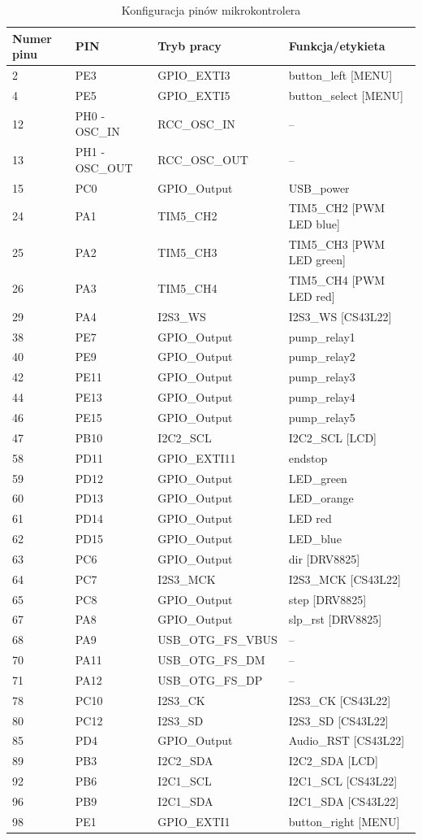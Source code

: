 \documentclass[10pt, a4paper]{article}
\begin{document}
\begin{table}[H]
	\centering
	\begin{tabular}{|l|l|l|l|}
		\hline
		Numer pinu	&	PIN & Tryb pracy & Funkcja/etykieta\\
		\hline
2&	PE3&	GPIO{\_}EXTI3&	button{\_}left [MENU] \\
4&	PE5&	GPIO{\_}EXTI5&	button{\_}select [MENU] \\
12&	PH0 - OSC{\_}IN&	RCC{\_}OSC{\_}IN& --	\\
13&	PH1 - OSC{\_}OUT&	RCC{\_}OSC{\_}OUT& --\\
15&	PC0&	GPIO{\_}Output&	USB{\_}power\\
24&	PA1&	TIM5{\_}CH2&	TIM5{\_}CH2 [PWM LED blue] \\
25&	PA2&	TIM5{\_}CH3&	TIM5{\_}CH3 [PWM LED green] \\
26&	PA3&	TIM5{\_}CH4&	TIM5{\_}CH4 [PWM LED red] \\
29&	PA4&	I2S3{\_}WS&	I2S3{\_}WS [CS43L22] \\
38&	PE7&	GPIO{\_}Output&	pump{\_}relay1\\
40&	PE9&	GPIO{\_}Output& pump{\_}relay2\\
42&	PE11&	GPIO{\_}Output&	pump{\_}relay3\\
44&	PE13&  GPIO{\_}Output&	pump{\_}relay4\\
46&	PE15&	GPIO{\_}Output& pump{\_}relay5\\
47&	PB10&	I2C2{\_}SCL&	I2C2{\_}SCL [LCD] \\
58&	PD11&	GPIO{\_}EXTI11&	endstop\\
59&	PD12&	GPIO{\_}Output&	LED{\_}green\\
60&	PD13&	GPIO{\_}Output&	LED{\_}orange\\
61&	PD14&	GPIO{\_}Output&	LED red\\
62&	PD15&	GPIO{\_}Output&	LED{\_}blue\\
63&	PC6&	GPIO{\_}Output&	dir [DRV8825] \\
64&	PC7&	I2S3{\_}MCK&	I2S3{\_}MCK [CS43L22] \\
65&	PC8&	GPIO{\_}Output&	step [DRV8825] \\
67&	PA8&	GPIO{\_}Output&	slp{\_}rst [DRV8825] \\
68&	PA9&	USB{\_}OTG{\_}FS{\_}VBUS&--	 \\
70&	PA11&	USB{\_}OTG{\_}FS{\_}DM& --\\	
71&	PA12&  USB{\_}OTG{\_}FS{\_}DP&--	 \\
78&	PC10&	I2S3{\_}CK& 	I2S3{\_}CK [CS43L22] \\
80&	PC12&	I2S3{\_}SD&	I2S3{\_}SD [CS43L22] \\
85&	PD4&	GPIO{\_}Output&	Audio{\_}RST [CS43L22] \\
89&	PB3&	I2C2{\_}SDA&	I2C2{\_}SDA [LCD] \\
92&	PB6&	I2C1{\_}SCL&	I2C1{\_}SCL [CS43L22] \\
96&	PB9&	I2C1{\_}SDA&	I2C1{\_}SDA [CS43L22] \\
98&	PE1&	GPIO{\_}EXTI1&	button{\_}right [MENU] \\


		\hline
	\end{tabular}
	\caption{Konfiguracja pinów mikrokontrolera}
	
\end{table}
\end{document}
